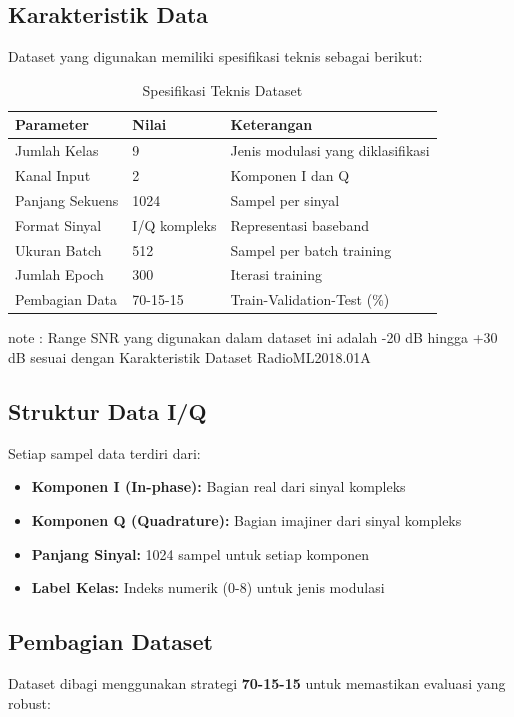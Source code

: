 \documentclass{article}
\begin{document}
\subsection{Karakteristik Data}
Dataset yang digunakan memiliki spesifikasi teknis sebagai berikut:

\begin{table}[h]
\centering
\caption{Spesifikasi Teknis Dataset}
\label{tab:dataset_specs}
\begin{tabular}{|l|l|l|}
\hline
\textbf{Parameter} & \textbf{Nilai} & \textbf{Keterangan} \\
\hline
Jumlah Kelas & 9 & Jenis modulasi yang diklasifikasi \\
Kanal Input & 2 & Komponen I dan Q \\
Panjang Sekuens & 1024 & Sampel per sinyal \\
Format Sinyal & I/Q kompleks & Representasi baseband \\
Ukuran Batch & 512 & Sampel per batch training \\
Jumlah Epoch & 300 & Iterasi training \\
Pembagian Data & 70-15-15 & Train-Validation-Test (\%) \\
\hline
\end{tabular}
\end{table}
note : 
Range SNR yang digunakan dalam dataset ini adalah -20 dB hingga +30 dB sesuai dengan Karakteristik Dataset RadioML2018.01A
\subsection{Struktur Data I/Q}
Setiap sampel data terdiri dari:
\begin{itemize}
    \item \textbf{Komponen I (In-phase):} Bagian real dari sinyal kompleks
    \item \textbf{Komponen Q (Quadrature):} Bagian imajiner dari sinyal kompleks  
    \item \textbf{Panjang Sinyal:} 1024 sampel untuk setiap komponen
    \item \textbf{Label Kelas:} Indeks numerik (0-8) untuk jenis modulasi
\end{itemize}

\subsection{Pembagian Dataset}
Dataset dibagi menggunakan strategi \textbf{70-15-15} untuk memastikan evaluasi yang robust:
\end{document}
